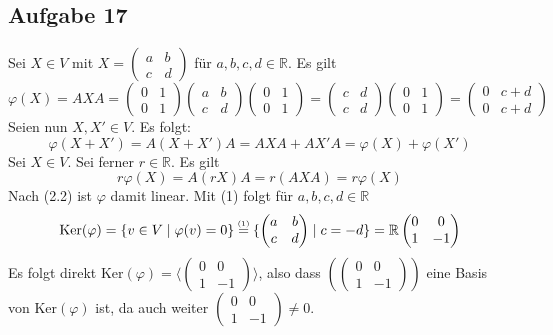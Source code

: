 \documentclass[a4paper,graphics,11pt]{article}
\newcommand{\aufgabe}[1]{\subsection*{Aufgabe #1}}
\newcommand{\up}[2]{\mathrel{\overset{\makebox[0pt]{\mbox{\normalfont\tiny #2}}}{#1}}}
\begin{document}
\aufgabe{17}
Sei $X \in V$ mit
$X = \begin{pmatrix}
        a & b\\
	    c & d
    \end{pmatrix}
$
für $a,b,c,d \in \mathbb{R}$. Es gilt
\begin{equation}
    \varphi(X)
    = AXA
    = \begin{pmatrix}
		0 & 1\\
		0 & 1
	\end{pmatrix}
    \begin{pmatrix}
		a & b\\
		c & d
	\end{pmatrix}
    \begin{pmatrix}
		0 & 1\\
		0 & 1
	\end{pmatrix}
    = \begin{pmatrix}
		c & d\\
		c & d
	\end{pmatrix}
    \begin{pmatrix}
		0 & 1\\
		0 & 1
	\end{pmatrix}
    = 
    \begin{pmatrix}
		0 & c+d\\
		0 & c+d
	\end{pmatrix}
\end{equation}
Seien nun $X, X' \in V$.
Es folgt:
$$
    \varphi(X+X')
    = A(X+X')A
    = AXA+AX'A
    = \varphi(X) + \varphi(X')
$$
Sei $X \in V$. Sei ferner $r \in \mathbb{R}$. Es gilt
$$
    r\varphi(X)
    = A(rX)A
    = r(AXA)
    = r\varphi(X)
$$
Nach (2.2) ist $\varphi$ damit linear.
\newpage
Mit (1) folgt für $a,b,c,d \in \mathbb{R}$
$$
    \text{Ker}(\varphi)
    = \{v \in V \mid \varphi(v) = 0\}
    \up{=}{(1)} \{\begin{pmatrix}
        a & b\\
        c & d
	\end{pmatrix}
    \mid c = -d\}
    = \mathbb{R}
    \begin{pmatrix}
        0 & 0\\
        1 & -1
	\end{pmatrix}
$$
Es folgt direkt $\text{Ker}(\varphi) = \langle
\begin{pmatrix}
    0 & 0\\
    1 & -1
\end{pmatrix}
\rangle$, also dass $(
\begin{pmatrix}
    0 & 0\\
    1 & -1
\end{pmatrix}
)$ eine Basis von $\text{Ker}(\varphi)$ ist, da auch
weiter $
\begin{pmatrix}
    0 & 0\\
    1 & -1
\end{pmatrix}
\neq 0
$.
\end{document}
